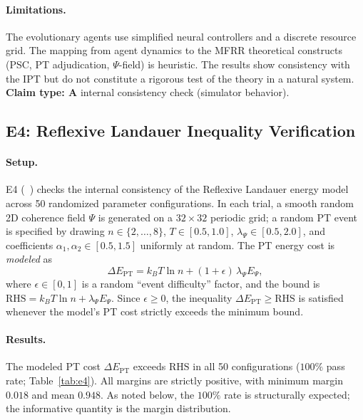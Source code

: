\documentclass[11pt,twocolumn]{article}
\newcommand{\CatA}{\textbf{A}}
\theoremstyle{remark}
\begin{document}
\paragraph{Limitations.}
The evolutionary agents use simplified neural controllers and a
discrete resource grid. The mapping from agent dynamics to the MFRR
theoretical constructs (PSC, PT adjudication, $\Psi$-field) is
heuristic. The results show consistency with the IPT but do not
constitute a rigorous test of the theory in a natural system.
\textbf{Claim type: $\CatA$} internal consistency check (simulator behavior).

\subsection{E4: Reflexive Landauer Inequality Verification}
\label{sec:validation:e4}

\paragraph{Setup.}
E4 (~\cite{ugp-physics-repo})
checks the internal consistency of the Reflexive Landauer energy model
across 50 randomized parameter configurations. In each trial, a smooth
random 2D coherence field $\Psi$ is generated on a $32\times32$ periodic
grid; a random PT event is specified by drawing $n \in \{2,\ldots,8\}$,
$T \in [0.5, 1.0]$, $\lambda_\Psi \in [0.5, 2.0]$, and coefficients
$\alpha_1, \alpha_2 \in [0.5, 1.5]$ uniformly at random. The PT energy
cost is \emph{modeled} as
\[
  \Delta E_{\mathrm{PT}}
  = k_B T \ln n + (1+\epsilon)\,\lambda_\Psi E_\Psi,
\]
where $\epsilon \in [0,1]$ is a random ``event difficulty'' factor,
and the bound is $\mathrm{RHS} = k_B T \ln n + \lambda_\Psi E_\Psi$.
Since $\epsilon \geq 0$, the inequality $\Delta E_{\mathrm{PT}} \geq
\mathrm{RHS}$ is satisfied whenever the model's PT cost strictly exceeds
the minimum bound.

\paragraph{Results.}
The modeled PT cost $\Delta E_{\mathrm{PT}}$ exceeds $\mathrm{RHS}$
in all 50 configurations ($100\%$ pass rate; Table~\ref{tab:e4}).
All margins are strictly positive, with minimum margin $0.018$ and
mean $0.948$. As noted below, the $100\%$ rate is structurally
expected; the informative quantity is the margin distribution.
\end{document}
